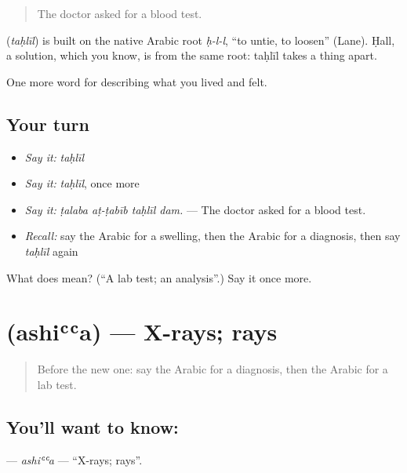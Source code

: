 \begin{quote}
The doctor asked for a blood test.
\end{quote}

\begin{cousinweb}
\textbf{} (\emph{taḥlīl}) is built on the native Arabic root \emph{ḥ-l-l}, \textquotedblleft{}to untie, to loosen\textquotedblright{} (Lane). Ḥall, a solution, which you know, is from the same root: taḥlīl takes a thing apart.
\end{cousinweb}

\begin{grammarlens}[title={What you've built}]
One more word for describing what you lived and felt.
\end{grammarlens}

\subsection*{Your turn}
\begin{itemize}
\raggedright
  \item \emph{Say it:} \emph{taḥlīl}
  \item \emph{Say it:} \emph{taḥlīl}, once more
  \item \emph{Say it:} \emph{ṭalaba aṭ-ṭabīb taḥlīl dam.} — The doctor asked for a blood test.
  \item \emph{Recall:} say the Arabic for a swelling, then the Arabic for a diagnosis, then say \emph{taḥlīl} again
\end{itemize}

\begin{tcolorbox}[breakable,colback=teal!4,colframe=teal!35!black,title={Before you move on}]
What does  mean? (\textquotedblleft{}A lab test; an analysis\textquotedblright{}.) Say it once more.
\end{tcolorbox}
\section[\texorpdfstring{\ar{أشعة} (ashiʿʿa)}{أشعة (ashiʿʿa)}]{ (ashiʿʿa) — X-rays; rays}

\label{lesson:AR-C510-ashia}



\begin{quote}
Before the new one: say the Arabic for a diagnosis, then the Arabic for a lab test.
\end{quote}

\subsection*{You'll want to know: }
\textbf{} — \emph{ashiʿʿa} — \textquotedblleft{}X-rays; rays\textquotedblright{}.

